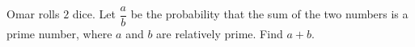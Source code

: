 Omar rolls $2$ dice. Let $\dfrac{a}{b}$ be the probability that the sum of the two numbers is a prime number, where $a$ and $b$ are relatively prime. Find $a + b$.
